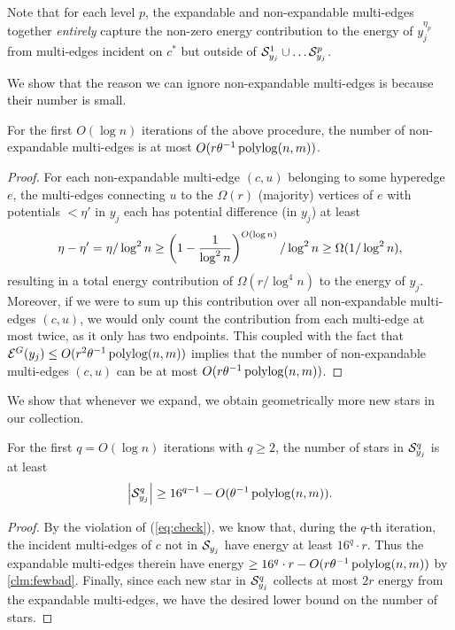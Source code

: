 \documentclass{article}
\begin{document}
\begin{remark}
    Note that for each level $p$,
    the expandable and non-expandable multi-edges together \textit{entirely} capture
    the non-zero energy contribution to the energy of $y^{\eta_p}_j$ from multi-edges incident on $c^*$ but outside of
    $\mathcal{S}_{y_j}^{1}\cup\ldots \mathcal{S}_{y_j}^{p}$.
\end{remark}

We show that the reason we can ignore non-expandable multi-edges is because
their number is small.
\begin{claim}\label{clm:fewbad}
    For the first $O(\log n)$ iterations of the above procedure,
    the number of non-expandable multi-edges is at most
    $O(r \theta^{-1}\operatorname{polylog}(n,m))$.
\end{claim}
\begin{proof}
    For each non-expandable multi-edge $(c,u)$ belonging to some hyperedge $e$,
    the multi-edges connecting $u$ to the $\Omega(r)$ (majority) vertices of $e$ with potentials
    $< \eta'$ in $y_j$ each has potential difference (in $y_j$) at least
    $$
    \eta - \eta' = \eta/\log^2 n \geq
    \left(1 - \frac{1}{\log^2 n}\right)^{O(\log n)} / \log^2 n \geq
    \Omega(1/\log^2 n),
    $$
    resulting in a total energy contribution of $\Omega(r/\log^4 n)$
    to the energy of $y_j$.
    Moreover, if we were to sum up this contribution over all non-expandable
    multi-edges $(c,u)$,
    we would only count the contribution from each multi-edge at most twice,
    as it only has two endpoints.
    This coupled with the fact that $\mathcal{E}^G(y_j) \leq O(r^2\theta^{-1}\operatorname{polylog}(n,m))$
    implies that the number of non-expandable multi-edges $(c,u)$ can be at most
    $O(r\theta^{-1}\operatorname{polylog}(n,m))$.
\end{proof}

We show that whenever we expand, we obtain geometrically more new stars in our collection.
\begin{claim}\label{clm:blowup}
    For the first $q = O(\log n)$ iterations with $q\geq 2$, the number
    of stars in $\mathcal{S}_{y_j}^{q}$ is at least
    \begin{align*}
        \left|\mathcal{S}_{y_j}^{q} \right| \geq
        16^{q-1} - O(\theta^{-1} \operatorname{polylog}(n,m)).
    \end{align*}
\end{claim}
\begin{proof}
By the violation of (\ref{eq:check}), we know that, during the $q$-th iteration,
the incident multi-edges of $c$ not in $\mathcal{S}_{y_j}$ have energy
at least $16^{q}\cdot r$.
Thus the expandable multi-edges therein have energy 
$\geq 16^{q}\cdot r - O(r\theta^{-1}\operatorname{polylog}(n,m))$ by \cref{clm:fewbad}.
Finally, since each new star in $\mathcal{S}_{y_j}^{q}$ collects at most
$2r$ energy from the expandable multi-edges,
we have the desired lower bound on the number of stars.
\end{proof}
\end{document}
